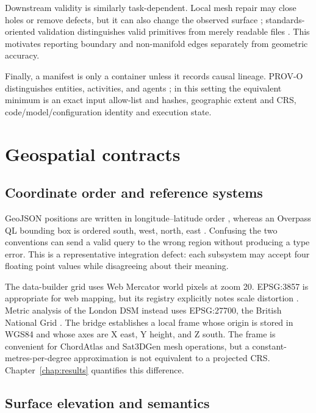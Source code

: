 Downstream validity is similarly task-dependent.  Local mesh repair may close
holes or remove defects, but it can also change the observed surface
\cite{attene2010repair}; standards-oriented validation distinguishes valid
primitives from merely readable files \cite{ledoux2018val3dity}.  This motivates
reporting boundary and non-manifold edges separately from geometric accuracy.

Finally, a manifest is only a container unless it records causal lineage.
PROV-O distinguishes entities, activities, and agents \cite{w3cProvO2013}; in
this setting the equivalent minimum is an exact input allow-list and hashes,
geographic extent and CRS, code/model/configuration identity and execution state.  

\section{Geospatial contracts}

\subsection{Coordinate order and reference systems}

GeoJSON positions are written in longitude--latitude order
\cite{butler2016geojson}, whereas an Overpass QL bounding box is ordered south,
west, north, east \cite{overpassQL}.  Confusing the two conventions can send a
valid query to the wrong region without producing a type error.  This is a
representative integration defect: each subsystem may accept four floating
point values while disagreeing about their meaning.

The data-builder grid uses Web Mercator world pixels at zoom 20.  EPSG:3857 is
appropriate for web mapping, but its registry explicitly notes scale
distortion \cite{epsg3857}.  Metric analysis of the London DSM instead uses
EPSG:27700, the British National Grid \cite{epsg27700}.  The bridge establishes
a local frame whose origin is stored in WGS84 and whose axes are X east, Y
height, and Z south.  The frame is convenient for ChordAtlas and Sat3DGen mesh
operations, but a constant-metres-per-degree approximation is not equivalent
to a projected CRS.  Chapter~\ref{chap:results} quantifies this difference.

\subsection{Surface elevation and semantics}

